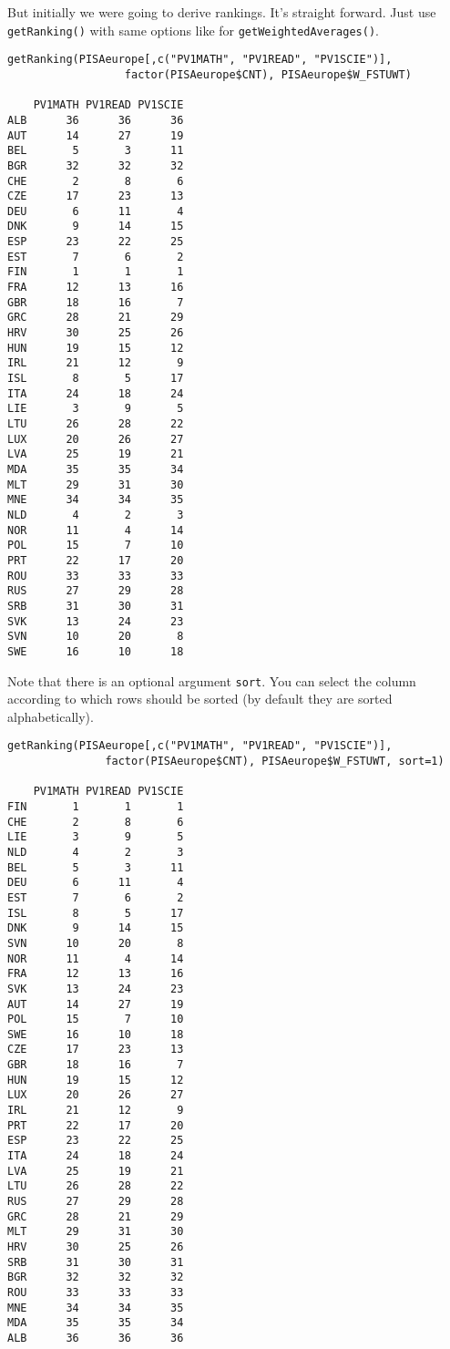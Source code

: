 But initially we were going to derive rankings. It's straight forward. Just use \verb:getRanking(): with same options like for \verb:getWeightedAverages():.

\begin{shaded}\begin{verbatim}
getRanking(PISAeurope[,c("PV1MATH", "PV1READ", "PV1SCIE")], 
                  factor(PISAeurope$CNT), PISAeurope$W_FSTUWT)
                  
    PV1MATH PV1READ PV1SCIE
ALB      36      36      36
AUT      14      27      19
BEL       5       3      11
BGR      32      32      32
CHE       2       8       6
CZE      17      23      13
DEU       6      11       4
DNK       9      14      15
ESP      23      22      25
EST       7       6       2
FIN       1       1       1
FRA      12      13      16
GBR      18      16       7
GRC      28      21      29
HRV      30      25      26
HUN      19      15      12
IRL      21      12       9
ISL       8       5      17
ITA      24      18      24
LIE       3       9       5
LTU      26      28      22
LUX      20      26      27
LVA      25      19      21
MDA      35      35      34
MLT      29      31      30
MNE      34      34      35
NLD       4       2       3
NOR      11       4      14
POL      15       7      10
PRT      22      17      20
ROU      33      33      33
RUS      27      29      28
SRB      31      30      31
SVK      13      24      23
SVN      10      20       8
SWE      16      10      18
\end{verbatim}\end{shaded}

Note that there is an optional argument \verb:sort:. You can select the column according to which rows should be sorted (by default they are sorted alphabetically).

\begin{shaded}\begin{verbatim}
getRanking(PISAeurope[,c("PV1MATH", "PV1READ", "PV1SCIE")], 
               factor(PISAeurope$CNT), PISAeurope$W_FSTUWT, sort=1)
               
    PV1MATH PV1READ PV1SCIE
FIN       1       1       1
CHE       2       8       6
LIE       3       9       5
NLD       4       2       3
BEL       5       3      11
DEU       6      11       4
EST       7       6       2
ISL       8       5      17
DNK       9      14      15
SVN      10      20       8
NOR      11       4      14
FRA      12      13      16
SVK      13      24      23
AUT      14      27      19
POL      15       7      10
SWE      16      10      18
CZE      17      23      13
GBR      18      16       7
HUN      19      15      12
LUX      20      26      27
IRL      21      12       9
PRT      22      17      20
ESP      23      22      25
ITA      24      18      24
LVA      25      19      21
LTU      26      28      22
RUS      27      29      28
GRC      28      21      29
MLT      29      31      30
HRV      30      25      26
SRB      31      30      31
BGR      32      32      32
ROU      33      33      33
MNE      34      34      35
MDA      35      35      34
ALB      36      36      36
\end{verbatim}\end{shaded}


